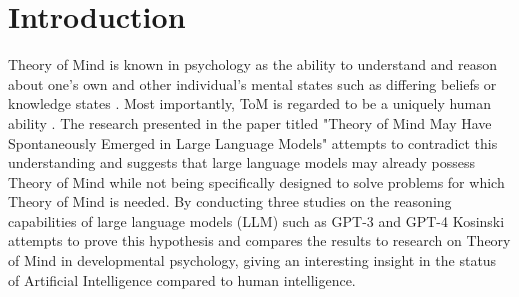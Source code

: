 \section{Introduction}

Theory of Mind is known in psychology as the ability to understand and reason about one's own and other individual's mental states such as differing beliefs or knowledge states \cite{theory_of_mind}. Most importantly, ToM is regarded to be a uniquely human ability \cite{tom_in_animals}. The research presented in the paper titled "Theory of Mind May Have Spontaneously Emerged in Large Language Models" attempts to contradict this understanding and suggests that large language models may already possess Theory of Mind while not being specifically designed to solve problems for which Theory of Mind is needed. By conducting three studies on the reasoning capabilities of large language models (LLM) such as GPT-3 and GPT-4 Kosinski attempts to prove this hypothesis and compares the results to research on Theory of Mind in developmental psychology, giving an interesting insight in the status of Artificial Intelligence compared to human intelligence.